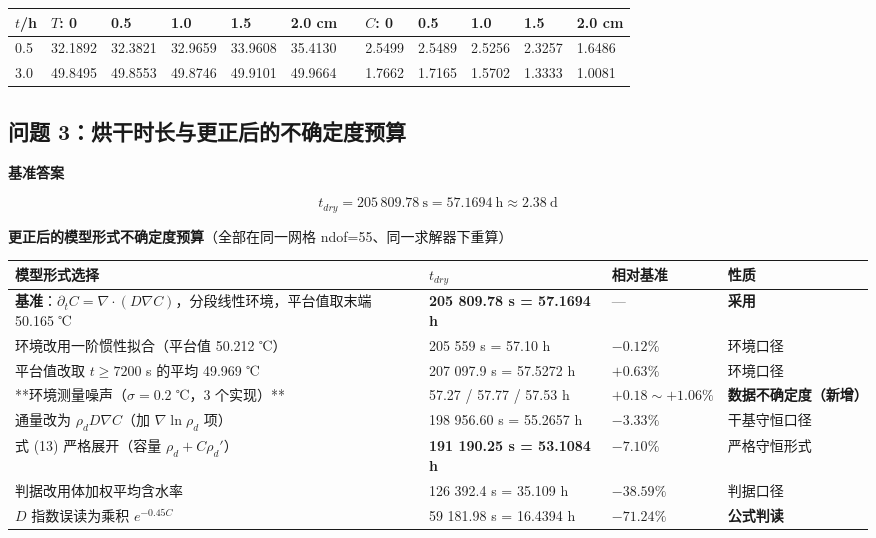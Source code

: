 \begin{center}
\small
\begin{tabular}{llllllllllll}
\toprule
$t$/h & $T$: 0 & 0.5 & 1.0 & 1.5 & 2.0 cm &  & $C$: 0 & 0.5 & 1.0 & 1.5 & 2.0 cm \\
\midrule
0.5 & 32.1892 & 32.3821 & 32.9659 & 33.9608 & 35.4130 &  & 2.5499 & 2.5489 & 2.5256 & 2.3257 & 1.6486 \\
3.0 & 49.8495 & 49.8553 & 49.8746 & 49.9101 & 49.9664 &  & 1.7662 & 1.7165 & 1.5702 & 1.3333 & 1.0081 \\
\bottomrule
\end{tabular}
\end{center}


\subsection{问题 3：烘干时长与\textbf{更正后的不确定度预算}}


\textbf{基准答案}


\begin{equation*}
t_{dry}=205\,809.78\ \mathrm s=57.1694\ \mathrm h\approx2.38\ \mathrm d
\end{equation*}


\textbf{更正后的模型形式不确定度预算}（全部在同一网格 ndof=55、同一求解器下重算）


\begin{center}
\small
\begin{tabular}{llll}
\toprule
模型形式选择 & $t_{dry}$ & 相对基准 & 性质 \\
\midrule
\textbf{基准}：$\partial_tC=\nabla\!\cdot\!(D\nabla C)$，分段线性环境，平台值取末端 50.165 ℃ & \textbf{205 809.78 s = 57.1694 h} & — & \textbf{采用} \\
环境改用一阶惯性拟合（平台值 50.212 ℃） & 205 559 s = 57.10 h & $-0.12\%$ & 环境口径 \\
平台值改取 $t\ge7200$ s 的平均 49.969 ℃ & 207 097.9 s = 57.5272 h & $+0.63\%$ & 环境口径 \\
**环境测量噪声（$\sigma=0.2$ ℃，3 个实现）** & 57.27 / 57.77 / 57.53 h & $+0.18\sim+1.06\%$ & \textbf{数据不确定度（新增）} \\
通量改为 $\rho_dD\nabla C$（加 $\nabla\ln\rho_d$ 项） & 198 956.60 s = 55.2657 h & $-3.33\%$ & 干基守恒口径 \\
式 (13) 严格展开（容量 $\rho_d+C\rho_d'$） & \textbf{191 190.25 s = 53.1084 h} & $\mathbf{-7.10\%}$ & 严格守恒形式 \\
判据改用体加权平均含水率 & 126 392.4 s = 35.109 h & $-38.59\%$ & 判据口径 \\
$D$ 指数误读为乘积 $e^{-0.45C}$ & 59 181.98 s = 16.4394 h & $-71.24\%$ & \textbf{公式判读} \\
\bottomrule
\end{tabular}
\end{center}


